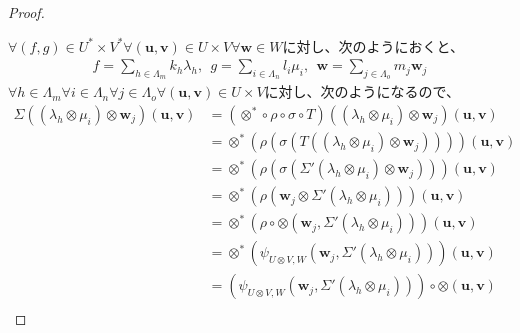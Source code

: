 \documentclass[dvipdfmx]{jsarticle}
\begin{document}
\begin{proof}
\begin{center}
\end{center}
$\forall(f,g) \in U^{*} \times V^{*}\forall\left( \mathbf{u},\mathbf{v} \right) \in U \times V\forall\mathbf{w} \in W$に対し、次のようにおくと、
\begin{align*}
f = \sum_{h \in \varLambda_{m}} {k_{h}\lambda_{h}},\ \ g = \sum_{i \in \varLambda_{n}} {l_{i}\mu_{i}},\ \ \mathbf{w} = \sum_{j \in \varLambda_{o}} {m_{j}\mathbf{w}_{j}}
\end{align*}
$\forall h \in \varLambda_{m}\forall i \in \varLambda_{n}\forall j \in \varLambda_{o}\forall\left( \mathbf{u},\mathbf{v} \right) \in U \times V$に対し、次のようになるので、
\begin{align*}
\varSigma\left( \left( \lambda_{h} \otimes \mu_{i} \right) \otimes \mathbf{w}_{j} \right)\left( \mathbf{u},\mathbf{v} \right) &= \left( \otimes^{*} \circ \rho \circ \sigma \circ T \right)\left( \left( \lambda_{h} \otimes \mu_{i} \right) \otimes \mathbf{w}_{j} \right)\left( \mathbf{u},\mathbf{v} \right)\\
&= \otimes^{*}\left( \rho\left( \sigma\left( T\left( \left( \lambda_{h} \otimes \mu_{i} \right) \otimes \mathbf{w}_{j} \right) \right) \right) \right)\left( \mathbf{u},\mathbf{v} \right)\\
&= \otimes^{*}\left( \rho\left( \sigma\left( \varSigma'\left( \lambda_{h} \otimes \mu_{i} \right) \otimes \mathbf{w}_{j} \right) \right) \right)\left( \mathbf{u},\mathbf{v} \right)\\
&= \otimes^{*}\left( \rho\left( \mathbf{w}_{j} \otimes \varSigma'\left( \lambda_{h} \otimes \mu_{i} \right) \right) \right)\left( \mathbf{u},\mathbf{v} \right)\\
&= \otimes^{*}\left( \rho \circ \otimes \left( \mathbf{w}_{j},\varSigma'\left( \lambda_{h} \otimes \mu_{i} \right) \right) \right)\left( \mathbf{u},\mathbf{v} \right)\\
&= \otimes^{*}\left( \psi_{U \otimes V,W}\left( \mathbf{w}_{j},\varSigma'\left( \lambda_{h} \otimes \mu_{i} \right) \right) \right)\left( \mathbf{u},\mathbf{v} \right)\\
&= \left( \psi_{U \otimes V,W}\left( \mathbf{w}_{j},\varSigma'\left( \lambda_{h} \otimes \mu_{i} \right) \right) \right) \circ \otimes \left( \mathbf{u},\mathbf{v} \right)\\

\end{align*}
\end{proof}
\end{document}
